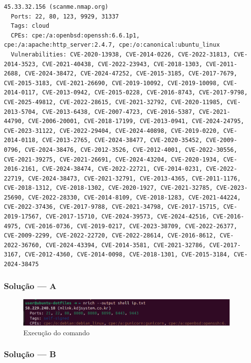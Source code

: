 \documentclass[12pt]{article}
\begin{document}
\begin{lstlisting}
45.33.32.156 (scanme.nmap.org)
  Ports: 22, 80, 123, 9929, 31337
  Tags: cloud
  CPEs: cpe:/a:openbsd:openssh:6.6.1p1, cpe:/a:apache:http_server:2.4.7, cpe:/o:canonical:ubuntu_linux
  Vulnerabilities: CVE-2020-13938, CVE-2014-0226, CVE-2022-31813, CVE-2014-3523, CVE-2021-40438, CVE-2022-23943, CVE-2018-1303, CVE-2011-2688, CVE-2024-38472, CVE-2024-47252, CVE-2015-3185, CVE-2017-7679, CVE-2015-3183, CVE-2021-26690, CVE-2019-10092, CVE-2019-10098, CVE-2014-0117, CVE-2013-0942, CVE-2015-0228, CVE-2016-8743, CVE-2017-9798, CVE-2025-49812, CVE-2022-28615, CVE-2021-32792, CVE-2020-11985, CVE-2013-5704, CVE-2013-6438, CVE-2007-4723, CVE-2016-5387, CVE-2021-44790, CVE-2006-20001, CVE-2018-17199, CVE-2013-0941, CVE-2024-24795, CVE-2023-31122, CVE-2022-29404, CVE-2024-40898, CVE-2019-0220, CVE-2014-0118, CVE-2013-2765, CVE-2024-38477, CVE-2020-35452, CVE-2009-0796, CVE-2024-38476, CVE-2012-3526, CVE-2012-4001, CVE-2022-30556, CVE-2021-39275, CVE-2021-26691, CVE-2024-43204, CVE-2020-1934, CVE-2016-2161, CVE-2024-38474, CVE-2022-22721, CVE-2014-0231, CVE-2022-22719, CVE-2024-38473, CVE-2021-32791, CVE-2013-4365, CVE-2011-1176, CVE-2018-1312, CVE-2018-1302, CVE-2020-1927, CVE-2021-32785, CVE-2023-25690, CVE-2022-28330, CVE-2014-8109, CVE-2018-1283, CVE-2021-44224, CVE-2022-37436, CVE-2017-9788, CVE-2021-34798, CVE-2017-15715, CVE-2019-17567, CVE-2017-15710, CVE-2024-39573, CVE-2024-42516, CVE-2016-4975, CVE-2016-0736, CVE-2019-0217, CVE-2023-38709, CVE-2022-26377, CVE-2009-2299, CVE-2022-22720, CVE-2022-28614, CVE-2016-8612, CVE-2022-36760, CVE-2024-43394, CVE-2014-3581, CVE-2021-32786, CVE-2017-3167, CVE-2012-4360, CVE-2014-0098, CVE-2018-1301, CVE-2015-3184, CVE-2024-38475
\end{lstlisting}

\subsubsection{Solução --- \textbf{A}}

\begin{figure}[h!]
\centerline{\includegraphics[totalheight=1.5cm]{nrich.png}}
  \caption{Execução do comando}
  \label{fig:nrich}
\end{figure}

\subsubsection{Solução --- \textbf{B}}
\end{document}
